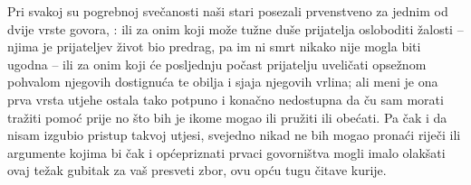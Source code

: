 \documentclass[a5paper,twoside]{article}
\begin{document}
\pstart
Pri svakoj su pogrebnoj svečanosti naši stari posezali prvenstveno za jednim od dvije vrste govora, : ili za onim koji može tužne duše prijatelja osloboditi žalosti – njima je prijateljev život bio predrag, pa im ni smrt nikako nije mogla biti ugodna – ili za onim koji će posljednju počast prijatelju uveličati opsežnom pohvalom njegovih dostignuća te obilja i sjaja njegovih vrlina; ali meni je ona prva vrsta utjehe ostala tako potpuno i konačno nedostupna da ču sam morati tražiti pomoć prije no što bih je ikome mogao ili pružiti ili obećati.  Pa čak i da nisam izgubio pristup takvoj utjesi, svejedno nikad ne bih mogao pronaći riječi ili argumente kojima bi čak i općepriznati prvaci govorništva mogli imalo olakšati ovaj težak gubitak za vaš presveti zbor, ovu opću tugu čitave kurije.
\pend
\pstart
\end{document}
